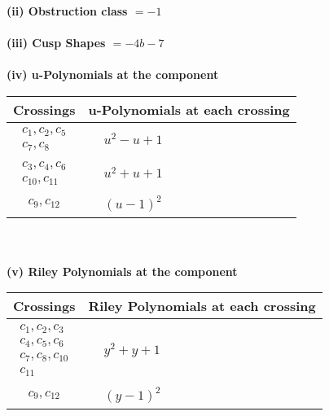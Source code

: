 \documentclass[1p]{elsarticle_modified}
\theoremstyle{definition}
\begin{document}
\flushleft \textbf{(ii) Obstruction class $= -1$}\\~\\
\flushleft \textbf{(iii) Cusp Shapes $= -4 b-7$}\\~\\
\newpage\renewcommand{\arraystretch}{1}
\flushleft \textbf{(iv) u-Polynomials at the component}\newline \\
\begin{tabular}{m{50pt}|m{274pt}}
Crossings & \hspace{64pt}u-Polynomials at each crossing \\
\hline $$\begin{aligned}c_{1},c_{2},c_{5}\\c_{7},c_{8}\end{aligned}$$&$\begin{aligned}
&u^2- u+1
\end{aligned}$\\
\hline $$\begin{aligned}c_{3},c_{4},c_{6}\\c_{10},c_{11}\end{aligned}$$&$\begin{aligned}
&u^2+u+1
\end{aligned}$\\
\hline $$\begin{aligned}c_{9},c_{12}\end{aligned}$$&$\begin{aligned}
&(u-1)^2
\end{aligned}$\\
\hline
\end{tabular}\\~\\
\newpage\renewcommand{\arraystretch}{1}
\flushleft \textbf{(v) Riley Polynomials at the component}\newline \\
\begin{tabular}{m{50pt}|m{274pt}}
Crossings & \hspace{64pt}Riley Polynomials at each crossing \\
\hline $$\begin{aligned}c_{1},c_{2},c_{3}\\c_{4},c_{5},c_{6}\\c_{7},c_{8},c_{10}\\c_{11}\end{aligned}$$&$\begin{aligned}
&y^2+y+1
\end{aligned}$\\
\hline $$\begin{aligned}c_{9},c_{12}\end{aligned}$$&$\begin{aligned}
&(y-1)^2
\end{aligned}$\\
\hline
\end{tabular}\\~\\
\end{document}
